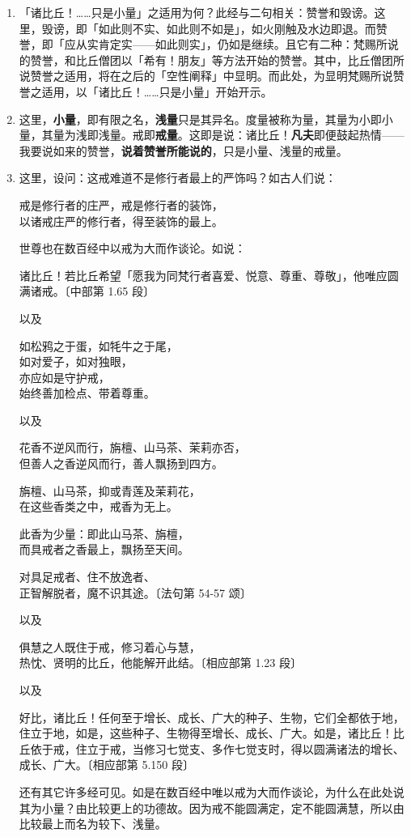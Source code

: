 \begin{enumerate}\item 「诸比丘！……只是小量」之适用为何？此经与二句相关：赞誉和毁谤。这里，毁谤，即「如此则不实、如此则不如是」，如火刚触及水边即退。而赞誉，即「应从实肯定实——如此则实」，仍如是继续。且它有二种：梵赐所说的赞誉，和比丘僧团以「希有！朋友」等方法开始的赞誉。其中，比丘僧团所说赞誉之适用，将在之后的「空性阐释」中显明。而此处，为显明梵赐所说赞誉之适用，以「诸比丘！……只是小量」开始开示。
\item 这里，\textbf{小量}，即有限之名，\textbf{浅量}只是其异名。度量被称为量，其量为小即小量，其量为浅即浅量。戒即\textbf{戒量}。这即是说：诸比丘！\textbf{凡夫}即便鼓起热情——我要说如来的赞誉，\textbf{说着赞誉所能说的}，只是小量、浅量的戒量。
\item 这里，设问：这戒难道不是修行者最上的严饰吗？如古人们说：\begin{quoting}戒是修行者的庄严，戒是修行者的装饰，\\以诸戒庄严的修行者，得至装饰的最上。\end{quoting}世尊也在数百经中以戒为大而作谈论。如说：\begin{quoting}诸比丘！若比丘希望「愿我为同梵行者喜爱、悦意、尊重、尊敬」，他唯应圆满诸戒。{\bluefootnotesize 〔中部第 1.65 段〕}\end{quoting}以及\begin{quoting}如松鸦之于蛋，如牦牛之于尾，\\如对爱子，如对独眼，\\亦应如是守护戒，\\始终善加检点、带着尊重。\end{quoting}以及\begin{quoting}花香不逆风而行，旃檀、山马茶、茉莉亦否，\\但善人之香逆风而行，善人飘扬到四方。\end{quoting}\begin{quoting}旃檀、山马茶，抑或青莲及茉莉花，\\在这些香类之中，戒香为无上。\end{quoting}\begin{quoting}此香为少量：即此山马茶、旃檀，\\而具戒者之香最上，飘扬至天间。\end{quoting}\begin{quoting}对具足戒者、住不放逸者、\\正智解脱者，魔不识其途。{\bluefootnotesize 〔法句第 54-57 颂〕}\end{quoting}以及\begin{quoting}俱慧之人既住于戒，修习着心与慧，\\热忱、贤明的比丘，他能解开此结。{\bluefootnotesize 〔相应部第 1.23 段〕}\end{quoting}以及\begin{quoting}好比，诸比丘！任何至于增长、成长、广大的种子、生物，它们全都依于地，住立于地，如是，这些种子、生物得至增长、成长、广大。如是，诸比丘！比丘依于戒，住立于戒，当修习七觉支、多作七觉支时，得以圆满诸法的增长、成长、广大。{\bluefootnotesize 〔相应部第 5.150 段〕}\end{quoting}还有其它许多经可见。如是在数百经中唯以戒为大而作谈论，为什么在此处说其为小量？由比较更上的功德故。因为戒不能圆满定，定不能圆满慧，所以由比较最上而名为较下、浅量。

\end{enumerate}
